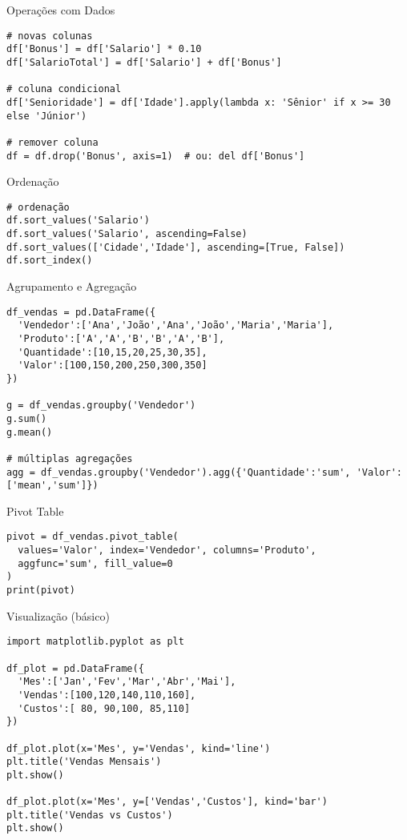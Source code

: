 \documentclass[aspectratio=169]{beamer}
\begin{document}
\begin{frame}[fragile]{Operações com Dados}
\begin{lstlisting}
# novas colunas
df['Bonus'] = df['Salario'] * 0.10
df['SalarioTotal'] = df['Salario'] + df['Bonus']

# coluna condicional
df['Senioridade'] = df['Idade'].apply(lambda x: 'Sênior' if x >= 30 else 'Júnior')

# remover coluna
df = df.drop('Bonus', axis=1)  # ou: del df['Bonus']
\end{lstlisting}
\end{frame}

\begin{frame}[fragile]{Ordenação}
\begin{lstlisting}
# ordenação
df.sort_values('Salario')
df.sort_values('Salario', ascending=False)
df.sort_values(['Cidade','Idade'], ascending=[True, False])
df.sort_index()
\end{lstlisting}
\end{frame}

\begin{frame}[fragile]{Agrupamento e Agregação}
\begin{lstlisting}
df_vendas = pd.DataFrame({
  'Vendedor':['Ana','João','Ana','João','Maria','Maria'],
  'Produto':['A','A','B','B','A','B'],
  'Quantidade':[10,15,20,25,30,35],
  'Valor':[100,150,200,250,300,350]
})

g = df_vendas.groupby('Vendedor')
g.sum()
g.mean()

# múltiplas agregações
agg = df_vendas.groupby('Vendedor').agg({'Quantidade':'sum', 'Valor':['mean','sum']})
\end{lstlisting}
\end{frame}

\begin{frame}[fragile]{Pivot Table}
\begin{lstlisting}
pivot = df_vendas.pivot_table(
  values='Valor', index='Vendedor', columns='Produto',
  aggfunc='sum', fill_value=0
)
print(pivot)
\end{lstlisting}
\end{frame}

\begin{frame}[fragile]{Visualização (básico)}
\begin{lstlisting}
import matplotlib.pyplot as plt

df_plot = pd.DataFrame({
  'Mes':['Jan','Fev','Mar','Abr','Mai'],
  'Vendas':[100,120,140,110,160],
  'Custos':[ 80, 90,100, 85,110]
})

df_plot.plot(x='Mes', y='Vendas', kind='line')
plt.title('Vendas Mensais')
plt.show()

df_plot.plot(x='Mes', y=['Vendas','Custos'], kind='bar')
plt.title('Vendas vs Custos')
plt.show()
\end{lstlisting}
\end{frame}
\end{document}

